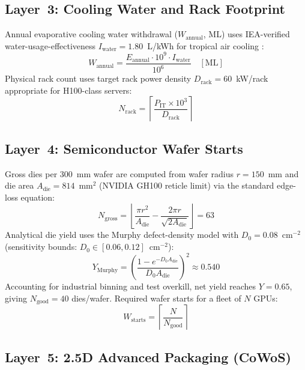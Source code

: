 \documentclass[conference]{IEEEtran}
\begin{document}
\subsection{Layer~3: Cooling Water and Rack Footprint}

Annual evaporative cooling water withdrawal ($W_{\text{annual}}$, ML) uses IEA-verified water-usage-effectiveness $I_{\text{water}} = 1.80$~L/kWh for tropical air cooling \cite{iea2024aienergy}:
\begin{equation}
  W_{\text{annual}} = \frac{E_{\text{annual}} \cdot 10^{9} \cdot I_{\text{water}}}{10^{6}} \quad [\text{ML}]
  \label{eq:water}
\end{equation}
Physical rack count uses target rack power density $D_{\text{rack}} = 60$~kW/rack appropriate for H100-class servers:
\begin{equation}
  N_{\text{rack}} = \left\lceil \frac{P_{\text{IT}} \times 10^{3}}{D_{\text{rack}}} \right\rceil
  \label{eq:racks}
\end{equation}

\subsection{Layer~4: Semiconductor Wafer Starts}

Gross dies per 300~mm wafer are computed from wafer radius $r = 150$~mm and die area $A_{\text{die}} = 814$~mm$^2$ (NVIDIA GH100 reticle limit) via the standard edge-loss equation:
\begin{equation}
  N_{\text{gross}} = \left\lfloor \frac{\pi r^{2}}{A_{\text{die}}} - \frac{2\pi r}{\sqrt{2A_{\text{die}}}} \right\rfloor = 63
  \label{eq:gross}
\end{equation}
Analytical die yield uses the Murphy defect-density model with $D_0 = 0.08$~cm$^{-2}$ (sensitivity bounds: $D_0 \in [0.06, 0.12]$~cm$^{-2}$):
\begin{equation}
  Y_{\text{Murphy}} = \left( \frac{1 - e^{-D_0 A_{\text{die}}}}{D_0 A_{\text{die}}} \right)^2 \approx 0.540
  \label{eq:murphy}
\end{equation}
Accounting for industrial binning and test overkill, net yield reaches $Y = 0.65$, giving $N_{\text{good}} = 40$ dies/wafer. Required wafer starts for a fleet of $N$ GPUs:
\begin{equation}
  W_{\text{starts}} = \left\lceil \frac{N}{N_{\text{good}}} \right\rceil
  \label{eq:wafers}
\end{equation}

\subsection{Layer~5: 2.5D Advanced Packaging (CoWoS)}
\end{document}
